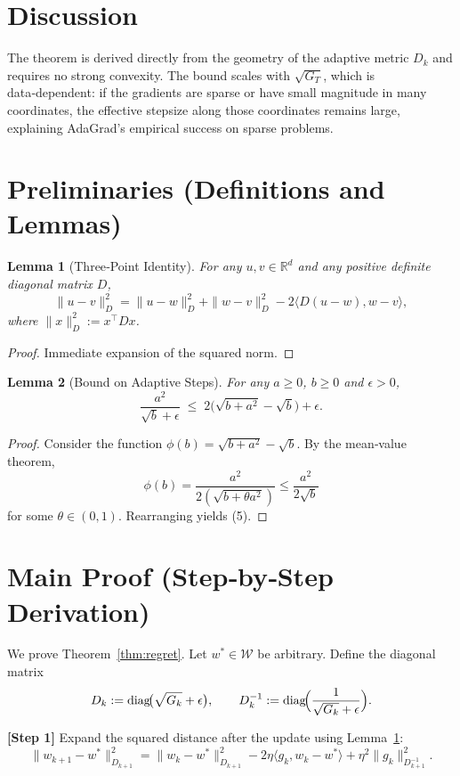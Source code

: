 \documentclass{article}
\newtheorem{lemma}{Lemma}
\newcommand{\RR}{\mathbb{R}}
\newcommand{\inner}[2]{\langle #1,#2\rangle}
\begin{document}
\section*{Discussion}
The theorem is derived directly from the geometry of the adaptive metric $D_{k}$ and requires no strong convexity. The bound scales with $\sqrt{G_{T}}$, which is data‑dependent: if the gradients are sparse or have small magnitude in many coordinates, the effective stepsize along those coordinates remains large, explaining AdaGrad’s empirical success on sparse problems.

\newpage

\section*{Preliminaries (Definitions and Lemmas)}
\begin{lemma}[Three‑Point Identity]\label{lem:three}
For any $u,v\in\RR^{d}$ and any positive definite diagonal matrix $D$,
\[
\|u-v\|_{D}^{2}
= \|u-w\|_{D}^{2}+\|w-v\|_{D}^{2}
-2\inner{D(u-w)}{w-v},
\]
where $\|x\|_{D}^{2}:=x^{\top}Dx$.
\end{lemma}
\begin{proof}
Immediate expansion of the squared norm. \qedhere
\end{proof}

\begin{lemma}[Bound on Adaptive Steps]\label{lem:step}
For any $a\ge0$, $b\ge0$ and $\epsilon>0$,
\[
\frac{a^{2}}{\sqrt{b}+\epsilon}\;\le\;2\bigl(\sqrt{b+a^{2}}-\sqrt{b}\bigr)+\epsilon.
\tag{5}
\]
\end{lemma}
\begin{proof}
Consider the function $\phi(b)=\sqrt{b+a^{2}}-\sqrt{b}$. By the mean‑value theorem,
\[
\phi(b)=\frac{a^{2}}{2(\sqrt{b+\theta a^{2}})}\le\frac{a^{2}}{2\sqrt{b}}
\]
for some $\theta\in(0,1)$. Rearranging yields (5). \qedhere
\end{proof}

\section*{Main Proof (Step‑by‑Step Derivation)}
We prove Theorem~\ref{thm:regret}. Let $w^{*}\in\mathcal{W}$ be arbitrary. Define the diagonal matrix
\[
D_{k}:=\operatorname{diag}\!\bigl(\sqrt{G_{k}}+\epsilon\bigr),\qquad
D_{k}^{-1}:=\operatorname{diag}\!\Bigl(\frac{1}{\sqrt{G_{k}}+\epsilon}\Bigr).
\]

\noindent\textbf{[Step 1]} Expand the squared distance after the update using Lemma~\ref{lem:three}:
\[
\|w_{k+1}-w^{*}\|_{D_{k+1}}^{2}
= \|w_{k}-w^{*}\|_{D_{k+1}}^{2}
-2\eta\inner{g_{k}}{w_{k}-w^{*}}
+\eta^{2}\|g_{k}\|_{D_{k+1}^{-1}}^{2}.
\tag{6}
\]
\end{document}
